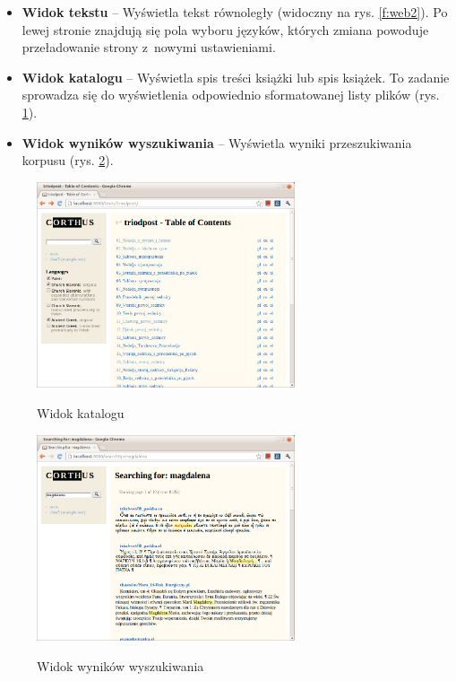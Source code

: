 \documentclass{pracamgr}
\begin{document}
\begin{itemize}
\item \textbf{Widok tekstu} -- Wyświetla tekst równoległy (widoczny na
  rys. \ref{f:web2}). Po lewej stronie znajdują się pola wyboru
  języków, których zmiana powoduje przeładowanie strony z~nowymi
  ustawieniami.
\item \textbf{Widok katalogu} -- Wyświetla spis treści książki lub spis
  książek.  To zadanie sprowadza się do wyświetlenia odpowiednio
  sformatowanej listy plików (rys. \ref{f:dir}).
\item \textbf{Widok wyników wyszukiwania} -- Wyświetla wyniki
  przeszukiwania korpusu (rys. \ref{f:search}).
\end{itemize}

\begin{figure}[h]
  \small \centering
  \caption{Widok katalogu}
  \includegraphics[width=3in]{webfolder.png}
  \label{f:dir}
\end{figure}

\begin{figure}[h]
  \small \centering
  \caption{Widok wyników wyszukiwania}
  \includegraphics[width=3in]{websearch.png}
  \label{f:search}
\end{figure}
\end{document}
